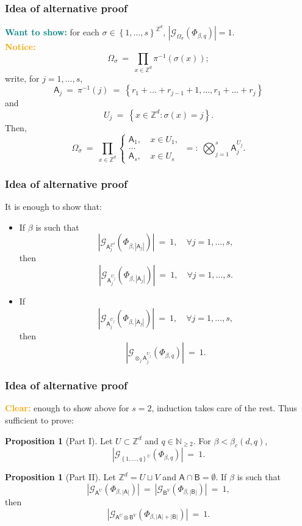\documentclass{beamer}
\renewcommand{\AA}{\mathsf{A}}
\newcommand{\AB}{\mathsf{B}}
\newcommand{\G}{\mathcal{G}}
\newcommand{\N}{\mathbb{N}}
\newcommand{\Z}{\mathbb{Z}}
\newcommand{\set}[1]{\left\{#1\right\}}
\newcommand{\1}{\mathbbm{1}}
\newcommand{\5}{\vspace{0.5cm}}
\newcommand{\3}{\vspace{0.3cm}}
\theoremstyle{definition}
\newtheorem{prop}[thm]{Proposition}
\begin{document}
\begin{frame}
\frametitle{Idea of alternative proof}
\textcolor{teal}{\textbf{Want to show:}} for each $\sigma\in\set{1,\ldots,s}^{\Z^d}$, $|\G_{\Omega_\sigma}(\Phi_{\beta,q})|=1$. \\\vspace{0.5cm}\pause
\textcolor{orange}{\textbf{Notice:}} 
$$\Omega_\sigma ~=~ \prod_{x\in\Z^d}\pi^{-1}(\sigma(x));$$\pause
write, for $j=1,\ldots,s$, 
$$\AA_j ~=~ \pi^{-1}(j) ~=~ \set{r_1+\ldots+r_{j-1}+1,\ldots,r_1+\ldots+r_j}$$\pause
and
$$U_j ~=~ \set{x\in\Z^d:\sigma(x)=j}.$$\pause
Then,
$$\Omega_\sigma ~=~ \prod_{x\in\Z^d}\begin{cases}
\AA_1, ~&x\in U_1, \\
\ldots \\
\AA_s, ~&x\in U_s
\end{cases} ~=:~ \bigotimes_{j=1}^s \AA_j^{U_j}.$$
\end{frame}

\begin{frame}
\frametitle{Idea of alternative proof}
It is enough to show that:\vspace{0.3cm}\pause
\begin{itemize}
	\item[(i)] If $\beta$ is such that 
	$$|\G_{\AA_j^{\Z^d}}(\Phi_{\beta,|\AA_j|})| ~=~ 1, \quad \forall j=1,\ldots,s,$$\pause
	then
	$$|\G_{\AA_j^{U_j}}(\Phi_{\beta,|\AA_j|})| ~=~ 1, \quad \forall j=1,\ldots,s.$$\pause
	\item[(ii)] If 
	$$|\G_{\AA_j^{U_j}}(\Phi_{\beta,|\AA_j|})| ~=~ 1, \quad \forall j=1,\ldots,s,$$\pause
	then
	$$|\G_{\otimes_j\AA_j^{U_j}}(\Phi_{\beta,q})| ~=~ 1.$$
\end{itemize}
\end{frame}

\begin{frame}
\frametitle{Idea of alternative proof}
\textcolor{orange}{\textbf{Clear:}} enough to show above for $s=2$, induction takes care of the rest. Thus sufficient to prove:\pause
\begin{prop}[Part I]
Let $U\subset\Z^d$ and $q\in\N_{\geq 2}$. For $\beta<\beta_c(d,q)$,
$$|\G_{\set{1,\ldots,q}^U}(\Phi_{\beta,q})| ~=~ 1.$$
\end{prop}\pause
\begin{prop}[Part II]
Let $\Z^d=U\sqcup V$ and $\AA\cap\AB=\emptyset$. If $\beta$ is such that
$$|\G_{\AA^U}(\Phi_{\beta,|\AA|})| ~=~ |\G_{\AB^V}(\Phi_{\beta,|\AB|})| ~=~ 1,$$
then
$$|\G_{\AA^U\otimes\AB^V}(\Phi_{\beta,|\AA|+|\AB|})| ~=~ 1.$$
\end{prop}
\end{frame}
\end{document}
